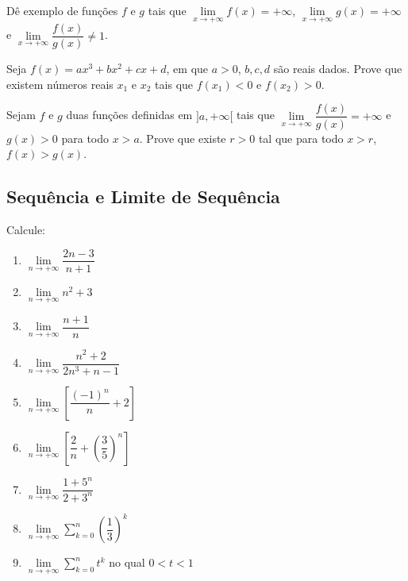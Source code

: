 \begin{exercicio}[7]
Dê exemplo de funções $f$ e $g$ tais que $\lim\limits_{x \to +\infty} f(x) = +\infty$, $\lim\limits_{x \to +\infty} g(x) = +\infty$ e $\lim\limits_{x \to +\infty} \dfrac{f(x)}{g(x)} \neq 1$.
\end{exercicio}

\begin{exercicio}[8]
Seja $f(x) = ax^3 + bx^2 + cx + d$, em que $a > 0$, $b, c, d$ são reais dados. Prove que existem números reais $x_1$ e $x_2$ tais que $f(x_1) < 0$ e $f(x_2) > 0$.
\end{exercicio}

\begin{exercicio}[9]
Sejam $f$ e $g$ duas funções definidas em $]a, +\infty[$ tais que $\lim\limits_{x \to +\infty} \dfrac{f(x)}{g(x)} = +\infty$ e $g(x) > 0$ para todo $x > a$. Prove que existe $r > 0$ tal que para todo $x > r$, $f(x) > g(x)$.
\end{exercicio}

\clearpage

\subsection{Sequência e Limite de Sequência}

\begin{exercicio}[1]
Calcule:
\begin{enumerate}[label=\alph*)]
    \item $\lim\limits_{n \to +\infty} \dfrac{2n - 3}{n + 1}$
    \item $\lim\limits_{n \to +\infty} n^2 + 3$
    \item $\lim\limits_{n \to +\infty} \dfrac{n + 1}{n}$
    \item $\lim\limits_{n \to +\infty} \dfrac{n^2 + 2}{2n^3 + n - 1}$
    \item $\lim\limits_{n \to +\infty} \left[\dfrac{(-1)^n}{n} + 2\right]$
    \item $\lim\limits_{n \to +\infty} \left[\dfrac{2}{n} + \left(\dfrac{3}{5}\right)^{\!n}\right]$
    \item $\lim\limits_{n \to +\infty} \dfrac{1 + 5^n}{2 + 3^n}$
    \item $\lim\limits_{n \to +\infty} \sum_{k = 0}^{n} \left(\dfrac{1}{3}\right)^{\!k}$
    \item $\lim\limits_{n \to +\infty} \sum_{k = 0}^{n} t^k$ no qual $0 < t < 1$
\end{enumerate}
\end{exercicio}


